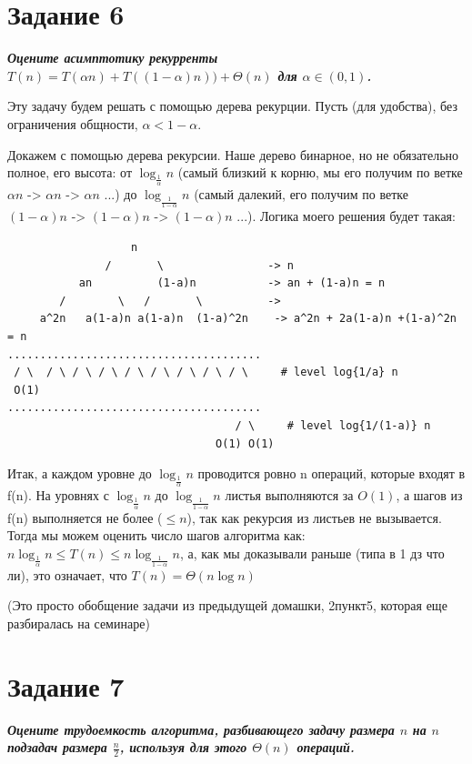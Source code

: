 \documentclass{article}
\begin{document}
\bigskip



\section*{\textbf{Задание 6}} \textbf{\textit{Оцените асимптотику рекурренты $T(n) = T(\alpha n) + T((1 - \alpha) n)) + \Theta(n)$ для $\alpha \in (0, 1)$.}}

Эту задачу будем решать с помощью дерева рекурции. Пусть (для удобства), без ограничения общности, $\alpha < 1 - \alpha$. 

Докажем с помощью дерева рекурсии. Наше дерево бинарное, но не обязательно полное, его высота: от $\log_{\frac{1}{\alpha}} n$ (самый близкий к корню, мы его получим по ветке $\alpha n$ -> $\alpha n$ -> $\alpha n$ ...) до $\log_{\frac{1}{1-\alpha}} n$ (самый далекий, его получим по ветке $(1-\alpha) n$ -> $(1-\alpha) n$ -> $(1-\alpha) n$ ...). Логика моего решения будет такая:

\begin{verbatim}
                   n
               /       \                -> n
           an          (1-a)n           -> an + (1-a)n = n
        /        \   /       \          -> 
     a^2n   a(1-a)n a(1-a)n  (1-a)^2n    -> a^2n + 2a(1-a)n +(1-a)^2n = n
.......................................
 / \  / \ / \ / \ / \ / \ / \ / \ / \     # level log{1/a} n
 O(1)  
.......................................
                                   / \     # level log{1/(1-a)} n
                                O(1) O(1)
\end{verbatim}

Итак, а каждом уровне до $\log_{\frac{1}{\alpha}} n$ проводится ровно n операций, которые входят в f(n). На уровнях с $\log_{\frac{1}{\alpha}} n$ до $\log_{\frac{1}{1-\alpha}} n$ листья выполняются за $O(1)$, а шагов из f(n) выполняется не более ($\leq n$), так как рекурсия из листьев не вызывается. Тогда мы можем оценить число шагов алгоритма как: $n \log_{\frac{1}{\alpha}} n  \leq T(n) \leq n \log_{\frac{1}{1-\alpha}} n$, а, как мы доказывали раньше (типа в 1 дз что ли), это означает, что $T(n) = \Theta (n \log n)$ 

(Это просто обобщение задачи из предыдущей домашки, 2пункт5, которая еще разбиралась на семинаре)

\bigskip



\section*{\textbf{Задание 7}} \textbf{\textit{Оцените трудоемкость алгоритма, разбивающего задачу размера $n$ на $n$ подзадач размера $\frac{n}{2}$, используя для этого $\Theta(n)$ операций.}}
\end{document}
